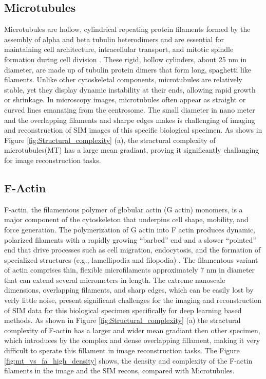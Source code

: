 \documentclass[11pt,
  paper=a4, 
  bibliography=totocnumbered,
	captions=tableheading,
	BCOR=10mm
]{scrreprt}
\theoremstyle{definition}
\newcommand{\figureref}[1]{Figure \ref{#1}}
\begin{document}
\vspace{1cm}
\noindent


\subsection{Microtubules}
\label{sec:microtubules}
Microtubules are hollow, cylindrical repeating protein filaments formed by the assembly of alpha and beta tubulin heterodimers and are essential 
for maintaining cell architecture, intracellular transport, and mitotic spindle formation during cell division \cite{microtubules}. 
These rigid, hollow cylinders, about 25 nm in diameter, are made up of tubulin protein dimers that form long, spaghetti like filaments.
Unlike other cytoskeletal components, microtubules are relatively stable, yet they display dynamic instability at their ends, allowing 
rapid growth or shrinkage. In microscopy images, microtubules often appear as straight or curved lines emanating from the centrosome. 
The small diameter in nano meter and the overlapping filaments and sharpe edges makes is challenging of imaging and reconstruction of 
SIM images of this specific biological specimen. As shows in \figureref{fig:Structural_complexity} (a), the stractural complexity of microtubules(MT) 
has a large mean gradiant, proving it significantly challanging for image reconstruction tasks.







\vspace{1cm}
\noindent


\subsection{F-Actin}
\label{sec:f-actin}

F-actin, the filamentous polymer of globular actin (G actin) monomers, is a major component of the cytoskeleton that underpins cell shape, mobility, 
and force generation. The polymerization of G actin into F actin produces dynamic, polarized filaments with a rapidly growing “barbed” end and a slower
 “pointed” end that drive processes such as cell migration, endocytosis, and the formation of specialized structures (e.g., lamellipodia and filopodia)\cite{f-actin} . 
 The filamentous variant of actin comprises thin, flexible microfilaments approximately 7 nm in diameter that can extend several micrometers in length. 
The extreme nanoscale dimensions, overlapping filaments, and sharp edges, which can be easily lost by verly little noise, present significant challenges
for the imaging and reconstruction of SIM data for this biological specimen specifically for deep learning based methods. As shown 
in \figureref{fig:Structural_complexity} (a)
the stractural complexity of F-actin has a larger and wider mean gradiant then other specimen, which introduces by the complex and dense overlapping fillament, 
making it very difficult to sperate this fillament in image reconstruction tasks. The  \figureref{fig:mt_vs_fa_high_density} shows, the density and complexity of the F-actin filaments 
in the image and the SIM recons, compared with Microtubules. 
\end{document}
